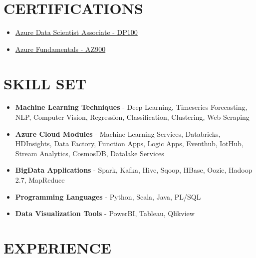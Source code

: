 \documentclass[11pt,a4paper,roman]{moderncv}        %
\begin{document}
\section{CERTIFICATIONS}
{\begin{itemize}
    \item {\href{https://www.credly.com/badges/a6183143-bff0-41e2-b81c-c2879f50c19d/public_url}{Azure Data Scientist Associate - DP100}}
    \item {\href{https://www.credly.com/badges/e2f12548-835d-4d8f-9355-0a157df89709/public_url}{Azure Fundamentals - AZ900}} 
\end{itemize}}

\section{SKILL SET}
{\begin{itemize}
  \item \textbf{Machine Learning Techniques} - Deep Learning, Timeseries Forecasting, NLP, Computer Vision, Regression, Classification, Clustering, Web Scraping
  \item \textbf{Azure Cloud Modules} - Machine Learning Services, Databricks, HDInsights, Data Factory, Function Apps, Logic Apps, Eventhub, IotHub, Stream Analytics, CosmosDB, Datalake Services
  \item \textbf{BigData Applications} - Spark, Kafka, Hive, Sqoop, HBase, Oozie, Hadoop 2.7, MapReduce
  \item \textbf{Programming Languages} - Python, Scala, Java, PL/SQL
  \item \textbf{Data Visualization Tools} - PowerBI, Tableau, Qlikview
\end{itemize}
}

\clearpage

\section{EXPERIENCE}
\end{document}
